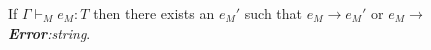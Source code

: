 \begin{mps}
\label{mps}
If $\Gamma\vdash_{M}e_{M}:T$ then there exists an $e_{M}'$ such that $e_{M}\rightarrow e_{M}'$ or $e_{M}\rightarrow$ \emph{\textbf{Error}:\;string}.
\end{mps}